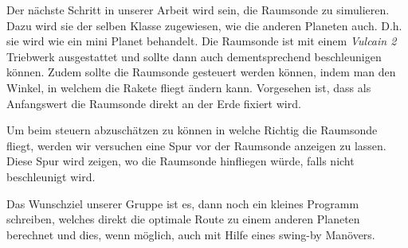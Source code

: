 \documentclass{article}
\begin{document}
Der nächste Schritt in unserer Arbeit wird sein, die Raumsonde zu simulieren. Dazu wird sie der selben Klasse zugewiesen, wie die anderen Planeten auch. D.h. sie wird wie ein mini Planet behandelt. Die Raumsonde ist mit einem \textit{Vulcain 2} Triebwerk ausgestattet und sollte dann auch dementsprechend beschleunigen können. Zudem sollte die Raumsonde gesteuert werden können, indem man den Winkel, in welchem die Rakete fliegt ändern kann. Vorgesehen ist, dass als Anfangswert die Raumsonde direkt an der Erde fixiert wird. 

Um beim steuern abzuschätzen zu können in welche Richtig die Raumsonde fliegt, werden wir versuchen eine Spur vor der Raumsonde anzeigen zu lassen. Diese Spur wird zeigen, wo die Raumsonde hinfliegen würde, falls nicht beschleunigt wird.

Das Wunschziel unserer Gruppe ist es, dann noch ein kleines Programm schreiben, welches direkt die optimale Route zu einem anderen Planeten berechnet und dies, wenn möglich, auch mit Hilfe eines swing-by Manövers.
\end{document}
